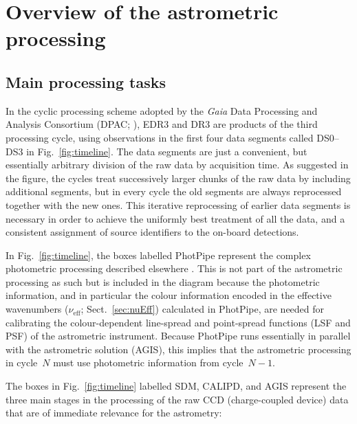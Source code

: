 \documentclass[longauth]{aa} %
\begin{document}
\section{Overview of the astrometric processing}
\label{sec:overview}

\subsection{Main processing tasks}
\label{sec:tasks}

In the cyclic processing scheme adopted by the \textit{Gaia} Data Processing and Analysis 
Consortium (DPAC; ), EDR3 and DR3 are products of the 
third processing cycle, using observations in the first four data segments called DS0--DS3
in Fig.~\ref{fig:timeline}. The data segments are just a convenient, but essentially
arbitrary division of the raw data by acquisition time. As suggested in the figure, the cycles 
treat successively larger chunks of the raw data by including additional segments, but in 
every cycle the old segments are always reprocessed together with the new ones. This 
iterative reprocessing of earlier data segments is necessary in order to achieve the 
uniformly best treatment of all the data, and a consistent assignment of source 
identifiers to the on-board detections.

In Fig.~\ref{fig:timeline}, the boxes labelled PhotPipe represent the complex photometric 
processing described elsewhere \citep{EDR3-DPACP-117,DPACP-118,DPACP-119,DPACP-120}.
This is not part of the astrometric processing as such but is included in the diagram because 
the photometric information, and in particular the colour information encoded in the 
effective wavenumbers ($\nu_\text{eff}$; Sect.~\ref{sec:nuEff}) calculated in PhotPipe, are 
needed for calibrating the colour-dependent line-spread and point-spread functions (LSF 
and PSF) of the astrometric instrument. Because PhotPipe runs essentially in parallel with 
the astrometric solution (AGIS), this implies that the astrometric processing in cycle~$N$ 
must use photometric information from cycle~$N{-}1$.

The boxes in Fig.~\ref{fig:timeline} labelled SDM, CALIPD, and AGIS represent the three 
main stages in the processing of the raw CCD (charge-coupled device) data that are of 
immediate relevance for the astrometry:
\end{document}
